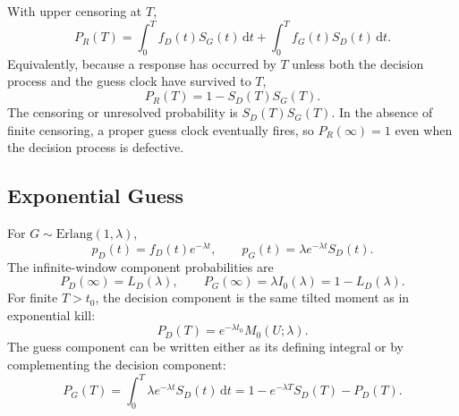 \documentclass[12pt]{article}
\newcommand{\dd}{\,\mathrm{d}}
\begin{document}
With upper censoring at $T$,
\begin{equation}
  P_R(T)=\int_0^T f_D(t)S_G(t)\dd t
  +\int_0^T f_G(t)S_D(t)\dd t.
  \label{eq:guess-window-response}
\end{equation}
Equivalently, because a response has occurred by $T$ unless both the decision process and the guess clock have survived to $T$,
\begin{equation}
  P_R(T)=1-S_D(T)S_G(T).
  \label{eq:guess-window-complement}
\end{equation}
The censoring or unresolved probability is $S_D(T)S_G(T)$. In the absence of finite censoring, a proper guess clock eventually fires, so $P_R(\infty)=1$ even when the decision process is defective.

\subsection{Exponential Guess}
For $G\sim\mathrm{Erlang}(1,\lambda)$,
\begin{equation}
  p_D(t)=f_D(t)e^{-\lambda t},
  \qquad
  p_G(t)=\lambda e^{-\lambda t}S_D(t).
\end{equation}
The infinite-window component probabilities are
\begin{equation}
  P_D(\infty)=L_D(\lambda),
  \qquad
  P_G(\infty)=\lambda I_0(\lambda)=1-L_D(\lambda).
  \label{eq:exp-guess-probs}
\end{equation}
For finite $T>t_0$, the decision component is the same tilted moment as in exponential kill:
\begin{equation}
  P_D(T)=e^{-\lambda t_0}M_0(U;\lambda).
\end{equation}
The guess component can be written either as its defining integral or by complementing the decision component:
\begin{equation}
  P_G(T)=\int_0^T \lambda e^{-\lambda t}S_D(t)\dd t
  =1-e^{-\lambda T}S_D(T)-P_D(T).
  \label{eq:exp-guess-window}
\end{equation}
\end{document}
